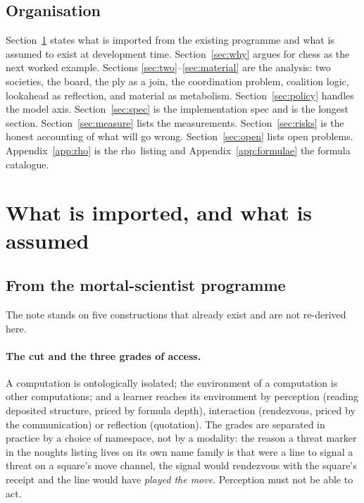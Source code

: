 \documentclass[11pt,a4paper]{article}
\theoremstyle{plain}
\theoremstyle{definition}
\theoremstyle{remark}
\newcommand{\rhoc}{\textsf{rho}}
\begin{document}
\subsection{Organisation}

Section~\ref{sec:imported} states what is imported from the existing programme
and what is assumed to exist at development time. Section~\ref{sec:why} argues
for chess as the next worked example. Sections \ref{sec:two}--\ref{sec:material}
are the analysis: two societies, the board, the ply as a join, the coordination
problem, coalition logic, lookahead as reflection, and material as metabolism. Section~\ref{sec:policy}
handles the model axis. Section~\ref{sec:spec} is the implementation spec and is
the longest section. Section~\ref{sec:measure} lists the measurements.
Section~\ref{sec:risks} is the honest accounting of what will go wrong.
Section~\ref{sec:open} lists open problems. Appendix~\ref{app:rho} is the
\rhoc\ listing and Appendix~\ref{app:formulae} the formula catalogue.

\section{What is imported, and what is assumed}
\label{sec:imported}

\subsection{From the mortal-scientist programme}

The note stands on five constructions that already exist and are not re-derived
here.

\paragraph{The cut and the three grades of access.} A computation is
ontologically isolated; the environment of a computation is other computations;
and a learner reaches its environment by perception (reading deposited
structure, priced by formula depth), interaction (rendezvous, priced by the
communication) or reflection (quotation). The grades are separated in practice
by a choice of namespace, not by a modality: the reason a threat marker in the
noughts listing lives on its own name family is that were a line to signal a
threat on a square's move channel, the signal would rendezvous with the
square's receipt and the line would have \emph{played the move}. Perception must
not be able to act.
\end{document}
